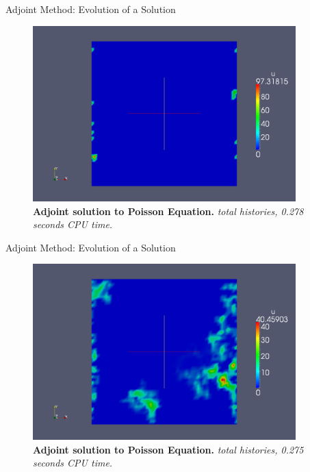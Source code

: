 \documentclass{beamer}
\begin{document}
\begin{frame}{Adjoint Method: Evolution of a Solution}

  \begin{figure}[h!]
    \begin{center}
      \includegraphics[width=4in]{adjoint_10.png}
    \end{center}
    \caption{\textbf{Adjoint solution to Poisson Equation.}
      \textit{ total histories, 0.278 seconds CPU time.} }
  \end{figure}

\end{frame}

\begin{frame}{Adjoint Method: Evolution of a Solution}

  \begin{figure}[h!]
    \begin{center}
      \includegraphics[width=4in]{adjoint_100.png}
    \end{center}
    \caption{\textbf{Adjoint solution to Poisson Equation.}
      \textit{ total histories, 0.275 seconds CPU time.} }
  \end{figure}

\end{frame}
\end{document}
